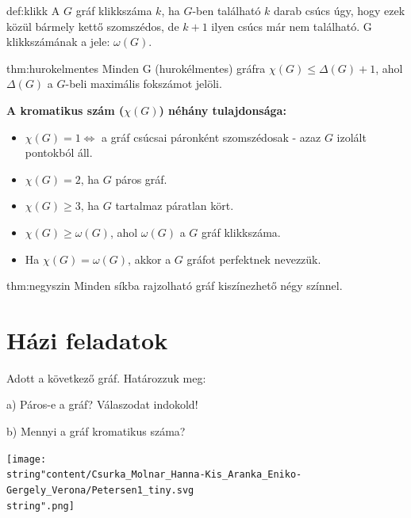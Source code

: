 \begin{definition}{def:klikk}
	A $G$ gráf klikkszáma $k$, ha $G$-ben található
	$k$ darab csúcs úgy, hogy ezek közül bármely kettő szomszédos, de
	$k+1$ ilyen csúcs már nem található. G klikkszámának a jele: $\omega(G)$.
\end{definition}
\begin{theorem}{thm:hurokelmentes}
	Minden G (hurokélmentes) gráfra $\chi(G)\leq\Delta(G)+1$, ahol $\Delta(G)$
	a $G$-beli maximális fokszámot jelöli. 
\end{theorem}

\textbf{A kromatikus szám ($\chi(G)$) néhány tulajdonsága:} 
\begin{itemize}
	\item $\chi(G)=1\Leftrightarrow$ a gráf csúcsai páronként szomszédosak
	- azaz $G$ izolált pontokból áll. 
	\item $\chi(G)=2$, ha $G$ páros gráf. 
	\item $\chi(G)\geq3$, ha $G$ tartalmaz páratlan kört. 
	\item $\chi(G)\geq\omega(G)$, ahol $\omega(G)$ a $G$ gráf klikkszáma. 
	\item Ha $\chi(G)=\omega(G)$, akkor a $G$ gráfot perfektnek nevezzük. 
\end{itemize}
\begin{theorem}{thm:negyszin}
	Minden síkba rajzolható gráf kiszínezhető négy színnel. 
\end{theorem}


\section*{Házi feladatok}
\begin{problem}
	Adott a következő gráf. Határozzuk meg:
	
	a) Páros-e a gráf? Válaszodat indokold!
	
	b) Mennyi a gráf kromatikus száma? 
	\begin{center}
		\texttt{[image: \\string"content/Csurka\_Molnar\_Hanna-Kis\_Aranka\_Eniko-Gergely\_Verona/Petersen1\_tiny.svg\\string".png]} 
		\par\end{center}
\end{problem}


